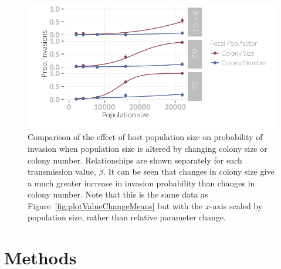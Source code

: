 \begin{knitrout}\footnotesize
{}\color{fgcolor}\begin{figure}[t]

{\centering \includegraphics[width=\textwidth]{figure/plotTransMeans-1} 

}

\caption[Comparison of the probability of invasion when host population size is altered by changing colony size or colony number.]{
Comparison of the effect of host population size on probability of invasion when population size is altered by changing colony size or colony number.
Relationships are shown separately for each transmission value, $\beta$.
It can be seen that changes in colony size give a much greater increase in invasion probability than changes in colony number.
Note that this is the same data as Figure~\ref{fig:plotValueChangeMeans} but with the $x$-axis scaled by population size, rather than relative parameter change.
}\label{fig:plotTransMeans}
\end{figure}


\end{knitrout}









\section{Methods}


